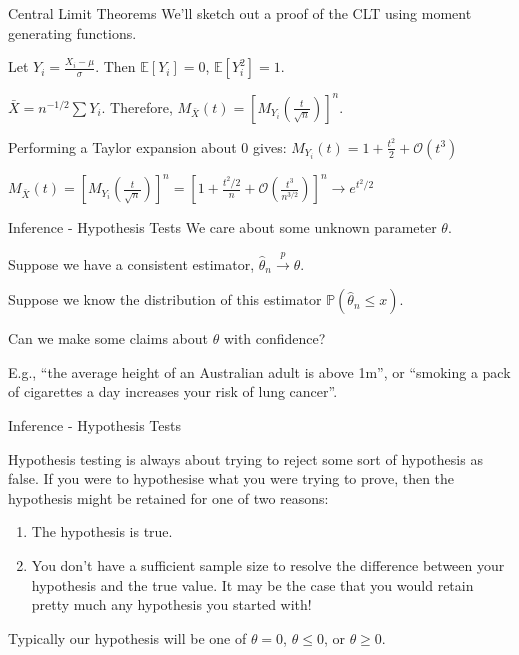 \documentclass[11pt, xcolor={dvipsnames}, hyperref={colorlinks, allcolors=Blue}]{beamer}
\renewcommand{\P}{\mathbb{P}}
\newcommand{\E}{\mathbb{E}}
\begin{document}
\begin{frame}{Central Limit Theorems}
We'll sketch out a proof of the CLT using moment generating functions.\medskip

Let $Y_{i} = \frac{X_{i} -  \mu}{\sigma}$. Then $\E[Y_{i}] = 0$, $\E[Y_{i}^{2}] = 1$.\bigskip

$\bar{X} = n^{-1/2}\sum Y_{i}$. Therefore, $M_{\bar{X}}(t) = \left [ M_{Y_{i}}(\frac{t}{\sqrt{n}}) \right]^{n}$.\bigskip

Performing a Taylor expansion about 0 gives: $M_{Y_{i}}(t) = 1 + \frac{t^{2}}{2} + \mathcal{O}\left(t^{3}\right)$ \bigskip

$M_{\bar{X}}(t) = \left [ M_{Y_{i}}(\frac{t}{\sqrt{n}}) \right]^{n} = \left[1 + \frac{t^{2}/2}{n} + \mathcal{O}\left( \frac{t^{3}}{n^{3/2}} \right) \right]^{n} \to e^{t^{2}/2}$

\end{frame}

\begin{frame}{Inference - Hypothesis Tests}
We care about some unknown parameter $\theta$.\bigskip

 Suppose we have a consistent estimator, $\hat{\theta}_{n} \overset{p}{\to} \theta$.\bigskip

Suppose we know the distribution of this estimator $\P(\hat{\theta}_{n} \leq x)$.\bigskip

Can we make some claims about $\theta$ with confidence?\bigskip

E.g., ``the average height of an Australian adult is above 1m'', or ``smoking a pack of cigarettes a day increases your risk of lung cancer''.

\end{frame}

\begin{frame}{Inference - Hypothesis Tests}

Hypothesis testing is always about trying to reject some sort of hypothesis as false. If you were to hypothesise what you were trying to prove, then the hypothesis might be retained for one of two reasons:\bigskip

\begin{enumerate}[1.]
\item The hypothesis is true.
\item You don't have a sufficient sample size to resolve the difference between your hypothesis and the true value. It may be the case that you would retain pretty much any hypothesis you started with!
\end{enumerate}
\bigskip

Typically our hypothesis will be one of $\theta = 0$, $\theta \leq 0$, or $\theta \geq 0$.


\end{frame}
\end{document}
